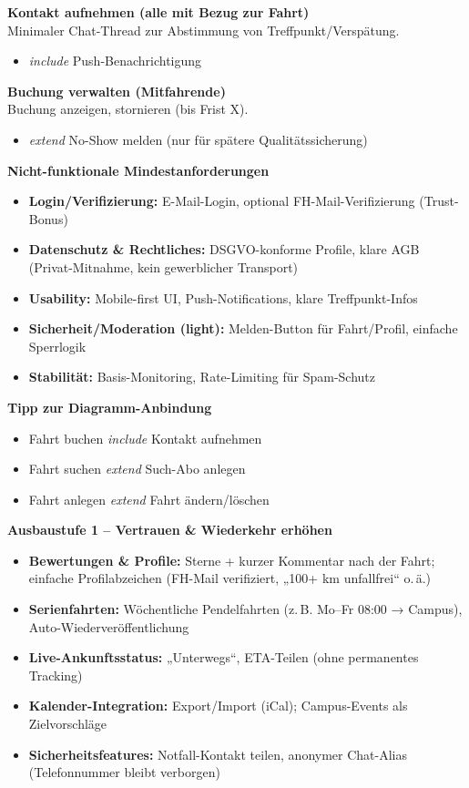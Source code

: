 \documentclass[12pt]{article}
\begin{document}
\textbf{Kontakt aufnehmen (alle mit Bezug zur Fahrt)}\\
Minimaler Chat-Thread zur Abstimmung von Treffpunkt/Verspätung.

\begin{itemize}
  \item \textit{include} Push-Benachrichtigung
\end{itemize}

\textbf{Buchung verwalten (Mitfahrende)}\\
Buchung anzeigen, stornieren (bis Frist X).

\begin{itemize}
  \item \textit{extend} No-Show melden (nur für spätere Qualitätssicherung)
\end{itemize}

\textbf{Nicht-funktionale Mindestanforderungen}

\begin{itemize}
  \item \textbf{Login/Verifizierung:} E-Mail-Login, optional FH-Mail-Verifizierung (Trust-Bonus)
  \item \textbf{Datenschutz \& Rechtliches:} DSGVO-konforme Profile, klare AGB (Privat-Mitnahme, kein gewerblicher Transport)
  \item \textbf{Usability:} Mobile-first UI, Push-Notifications, klare Treffpunkt-Infos
  \item \textbf{Sicherheit/Moderation (light):} Melden-Button für Fahrt/Profil, einfache Sperrlogik
  \item \textbf{Stabilität:} Basis-Monitoring, Rate-Limiting für Spam-Schutz
\end{itemize}

\textbf{Tipp zur Diagramm-Anbindung}

\begin{itemize}
  \item Fahrt buchen \textit{include} Kontakt aufnehmen
  \item Fahrt suchen \textit{extend} Such-Abo anlegen
  \item Fahrt anlegen \textit{extend} Fahrt ändern/löschen
\end{itemize}

\textbf{Ausbaustufe 1 – Vertrauen \& Wiederkehr erhöhen}

\begin{itemize}
  \item \textbf{Bewertungen \& Profile:} Sterne + kurzer Kommentar nach der Fahrt; einfache Profilabzeichen (FH-Mail verifiziert, „100+ km unfallfrei“ o.\,ä.)
  \item \textbf{Serienfahrten:} Wöchentliche Pendelfahrten (z.\,B. Mo–Fr 08:00 → Campus), Auto-Wiederveröffentlichung
  \item \textbf{Live-Ankunftsstatus:} „Unterwegs“, ETA-Teilen (ohne permanentes Tracking)
  \item \textbf{Kalender-Integration:} Export/Import (iCal); Campus-Events als Zielvorschläge
  \item \textbf{Sicherheitsfeatures:} Notfall-Kontakt teilen, anonymer Chat-Alias (Telefonnummer bleibt verborgen)
\end{itemize}
\end{document}
